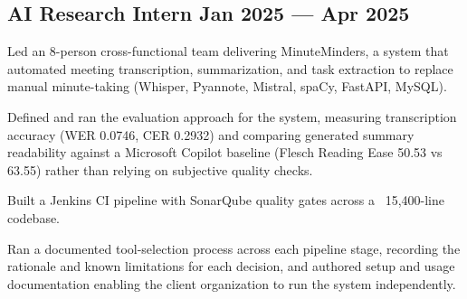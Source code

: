 \subsection{{AI Research Intern  \hfill Jan 2025 --- Apr 2025}}
\begin{zitemize}
    \item Led an 8-person cross-functional team delivering MinuteMinders, a system that automated meeting transcription, summarization, and task extraction to replace manual minute-taking (Whisper, Pyannote, Mistral, spaCy, FastAPI, MySQL).
    \item Defined and ran the evaluation approach for the system, measuring transcription accuracy (WER 0.0746, CER 0.2932) and comparing generated summary readability against a Microsoft Copilot baseline (Flesch Reading Ease 50.53 vs 63.55) rather than relying on subjective quality checks.
    \item Built a Jenkins CI pipeline with SonarQube quality gates across a ~15,400-line codebase.
    \item Ran a documented tool-selection process across each pipeline stage, recording the rationale and known limitations for each decision, and authored setup and usage documentation enabling the client organization to run the system independently.
    
\end{zitemize}

